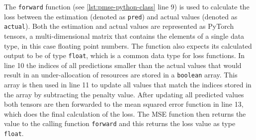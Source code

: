     The \texttt{forward} function (see \ref{lst:pmse-python-class} line 9) is used to calculate the loss between the estimation (denoted as \texttt{pred}) and actual values (denoted as \texttt{actual}). Both the estimation and actual values are represented as PyTorch tensors, a multi-dimensional matrix that contains the elements of a single data type, in this case floating point numbers.
    The function also expects its calculated output to be of type \texttt{float}, which is a common data type for loss functions.
    In line 10 the indices of all predictions smaller than the actual values that would result in an under-allocation of resources are stored in a \texttt{boolean} array.
    This array is then used in line 11 to update all values that match the indices stored in the array by subtracting the penalty value.
    After updating all predicted values both tensors are then forwarded to the mean squared error function in line 13, which does the final calculation of the loss.
    The MSE function then returns the value to the calling function \texttt{forward} and this returns the loss value as type \texttt{float}.





